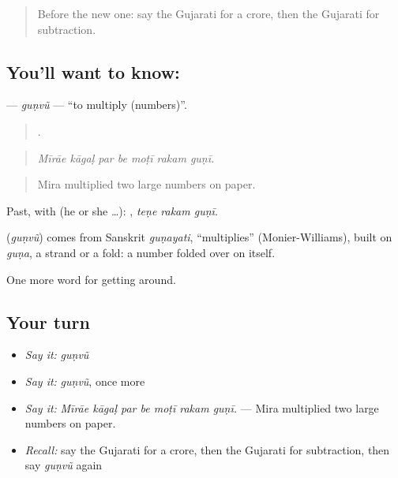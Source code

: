 \label{lesson:GU-C426-gunvu}



\begin{quote}
Before the new one: say the Gujarati for a crore, then the Gujarati for subtraction.
\end{quote}

\subsection*{You'll want to know: }
\textbf{} — \emph{guṇvũ} — \textquotedblleft{}to multiply (numbers)\textquotedblright{}.

\begin{quote}
      .
\end{quote}

\begin{quote}
\emph{Mīrāe kāgaḷ par be moṭī rakam guṇī.}
\end{quote}

\begin{quote}
Mira multiplied two large numbers on paper.
\end{quote}

Past, with  (he or she …):   , \emph{teṇe rakam guṇī}.

\begin{cousinweb}
\textbf{} (\emph{guṇvũ}) comes from Sanskrit \emph{guṇayati}, \textquotedblleft{}multiplies\textquotedblright{} (Monier-Williams), built on \emph{guṇa}, a strand or a fold: a number folded over on itself.
\end{cousinweb}

\begin{grammarlens}[title={What you've built}]
One more word for getting around.
\end{grammarlens}

\subsection*{Your turn}
\begin{itemize}
\raggedright
  \item \emph{Say it:} \emph{guṇvũ}
  \item \emph{Say it:} \emph{guṇvũ}, once more
  \item \emph{Say it:} \emph{Mīrāe kāgaḷ par be moṭī rakam guṇī.} — Mira multiplied two large numbers on paper.
  \item \emph{Recall:} say the Gujarati for a crore, then the Gujarati for subtraction, then say \emph{guṇvũ} again
\end{itemize}

